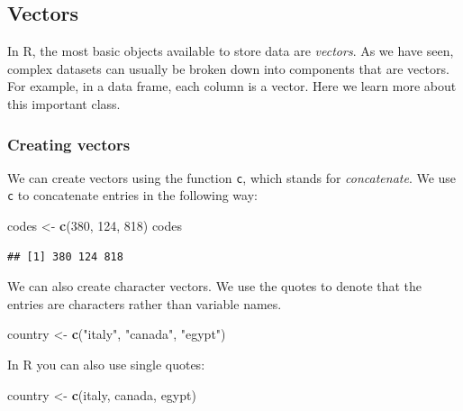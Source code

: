 \documentclass[
]{article}
\newenvironment{Shaded}{\begin{snugshade}}{\end{snugshade}}
\newcommand{\DecValTok}[1]{\textcolor[rgb]{0.00,0.00,0.81}{#1}}
\newcommand{\FunctionTok}[1]{\textcolor[rgb]{0.13,0.29,0.53}{\textbf{#1}}}
\newcommand{\NormalTok}[1]{#1}
\newcommand{\OtherTok}[1]{\textcolor[rgb]{0.56,0.35,0.01}{#1}}
\newcommand{\StringTok}[1]{\textcolor[rgb]{0.31,0.60,0.02}{#1}}
\begin{document}
\subsection{Vectors}\label{vectors}

In R, the most basic objects available to store data are \emph{vectors}.
As we have seen, complex datasets can usually be broken down into
components that are vectors. For example, in a data frame, each column
is a vector. Here we learn more about this important class.

\subsubsection{Creating vectors}\label{creating-vectors}

We can create vectors using the function \texttt{c}, which stands for
\emph{concatenate}. We use \texttt{c} to concatenate entries in the
following way:

\begin{Shaded}
\begin{Highlighting}[]
\NormalTok{codes }\OtherTok{\textless{}{-}} \FunctionTok{c}\NormalTok{(}\DecValTok{380}\NormalTok{, }\DecValTok{124}\NormalTok{, }\DecValTok{818}\NormalTok{)}
\NormalTok{codes}
\end{Highlighting}
\end{Shaded}

\begin{verbatim}
## [1] 380 124 818
\end{verbatim}

We can also create character vectors. We use the quotes to denote that
the entries are characters rather than variable names.

\begin{Shaded}
\begin{Highlighting}[]
\NormalTok{country }\OtherTok{\textless{}{-}} \FunctionTok{c}\NormalTok{(}\StringTok{"italy"}\NormalTok{, }\StringTok{"canada"}\NormalTok{, }\StringTok{"egypt"}\NormalTok{)}
\end{Highlighting}
\end{Shaded}

In R you can also use single quotes:

\begin{Shaded}
\begin{Highlighting}[]
\NormalTok{country }\OtherTok{\textless{}{-}} \FunctionTok{c}\NormalTok{(}\StringTok{\textquotesingle{}italy\textquotesingle{}}\NormalTok{, }\StringTok{\textquotesingle{}canada\textquotesingle{}}\NormalTok{, }\StringTok{\textquotesingle{}egypt\textquotesingle{}}\NormalTok{)}
\end{Highlighting}
\end{Shaded}
\end{document}
